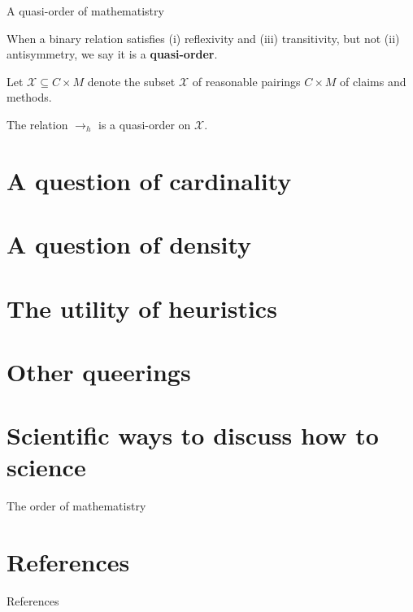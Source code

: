 \documentclass{beamer}
\begin{document}
\begin{frame}{A quasi-order of mathematistry}

 \begin{definition}
 When a binary relation satisfies (i) reflexivity and (iii) transitivity, but not (ii) antisymmetry, we say it is a \textbf{quasi-order}.
 \end{definition}

\vspace{1cm}

 Let $\mathcal X \subseteq C \times M$ denote the subset $\mathcal X$ of reasonable pairings $C \times M$ of claims and methods.

 \bigskip

    \begin{lemma}\label{lem:quasi}
The relation $\to_h$ is a quasi-order on $\mathcal X$.
\end{lemma}
\end{frame}


\section{A question of cardinality}

\section{A question of density}

\section{The utility of heuristics}

\section{Other queerings}

\section{Scientific ways to discuss how to science}



\begin{frame}{The order of mathematistry}

\end{frame}


\section*{References}

\begin{frame}[allowframebreaks]{References}
\printbibliography
\end{frame}
\end{document}
